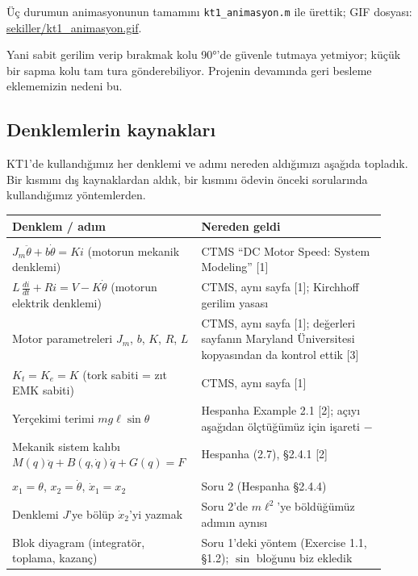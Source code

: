 \documentclass[11pt,a4paper]{article}
\begin{document}
Üç durumun animasyonunun tamamını \texttt{kt1\_animasyon.m} ile ürettik; GIF dosyası: \url{sekiller/kt1_animasyon.gif}.

Yani sabit gerilim verip bırakmak kolu 90°'de güvenle tutmaya yetmiyor; küçük bir sapma kolu tam tura gönderebiliyor. Projenin devamında geri besleme eklememizin nedeni bu.

\subsection*{Denklemlerin kaynakları}

KT1'de kullandığımız her denklemi ve adımı nereden aldığımızı aşağıda topladık. Bir kısmını dış kaynaklardan aldık, bir kısmını ödevin önceki sorularında kullandığımız yöntemlerden.

\begin{center}
\small
\begin{tabular}{>{\raggedright\arraybackslash}p{0.44\linewidth}>{\raggedright\arraybackslash}p{0.48\linewidth}}
\toprule
Denklem / adım & Nereden geldi\\
\midrule
\multicolumn{2}{l}{\textit{Dış kaynaklar}}\\
$J_m\ddot\theta + b\dot\theta = K i$ (motorun mekanik denklemi) & CTMS ``DC Motor Speed: System Modeling'' [1]\\
$L\,\frac{di}{dt} + R i = V - K\dot\theta$ (motorun elektrik denklemi) & CTMS, aynı sayfa [1]; Kirchhoff gerilim yasası\\
Motor parametreleri $J_m$, $b$, $K$, $R$, $L$ & CTMS, aynı sayfa [1]; değerleri sayfanın Maryland Üniversitesi kopyasından da kontrol ettik [3]\\
$K_t = K_e = K$ (tork sabiti = zıt EMK sabiti) & CTMS, aynı sayfa [1]\\
Yerçekimi terimi $mg\ell\sin\theta$ & Hespanha Example 2.1 [2]; açıyı aşağıdan ölçtüğümüz için işareti $-$\\
Mekanik sistem kalıbı $M(q)\ddot q + B(q,\dot q)\dot q + G(q) = F$ & Hespanha (2.7), §2.4.1 [2]\\
\midrule
\multicolumn{2}{l}{\textit{Önceki sorulardan}}\\
$x_1 = \theta$, $x_2 = \dot\theta$, $\dot x_1 = x_2$ & Soru 2 (Hespanha §2.4.4)\\
Denklemi $J$'ye bölüp $\dot x_2$'yi yazmak & Soru 2'de $m\ell^2$'ye böldüğümüz adımın aynısı\\
Blok diyagram (integratör, toplama, kazanç) & Soru 1'deki yöntem (Exercise 1.1, §1.2); $\sin$ bloğunu biz ekledik\\

\end{tabular}
\end{center}
\end{document}
